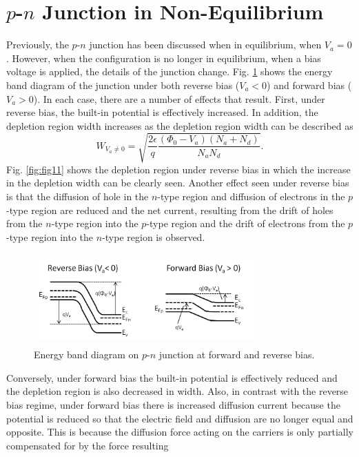 \documentclass[%
 reprint,
 amsmath,amssymb,
 aps,
pra,
floatfix,
]{revtex4-1}
\begin{document}
\section{$p$-$n$ Junction in Non-Equilibrium}\label{sec:sec003}
Previously, the $p$-$n$ junction has been discussed when in equilibrium, when $V_a = 0$. However,
when the configuration is no longer in equilibrium, when a bias voltage is applied, the details of the 
junction change. Fig. \ref{fig:fig4} shows the energy band diagram of the junction under both 
reverse bias ($V_a<0$) and forward bias ($V_a>0$). In each case, there are a number of effects that result. 
First, under reverse bias, the built-in potential is effectively increased. In addition, the depletion region width
increases as the depletion region width can be described as 
%
\begin{equation}
    W_{V_a\neq0} = \sqrt{\frac{2\epsilon}{q}\frac{\left(\Phi_0-V_a\right)\left(N_a+N_d\right)}{N_aN_d}}.
\end{equation}
%
Fig. \ref{fig:fig11} shows the depletion region under reverse bias in which the increase in the 
depletion width can be clearly seen. Another effect seen under reverse bias is that the 
diffusion of hole in the $n$-type region and diffusion of electrons in the $p$-type region are reduced and the net current,
resulting from the drift of holes from the $n$-type region into the $p$-type region and the drift of electrons
from the $p$-type region into the $n$-type region is observed. 
%
\begin{figure}[h!]
    \centering
    \includegraphics[height=3.5cm,width=8.5cm]{figs/bias_pn_junction}
    \caption{Energy band diagram on $p$-$n$ junction at forward and reverse bias.}
    \label{fig:fig4}
\end{figure}
%
Conversely, under forward bias the built-in potential
is effectively reduced and the depletion region is also decreased in width. Also, in contrast with the reverse bias regime, 
under forward bias there is increased diffusion current because the potential is reduced so that the electric field and diffusion are 
no longer equal and opposite. This is because the diffusion force acting on the carriers is only partially compensated for by the force resulting
\end{document}
